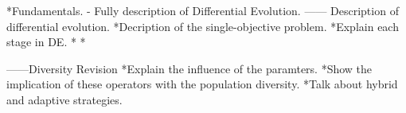 *Fundamentals. - Fully description of Differential Evolution.
------ Description of differential evolution.
*Decription of the single-objective problem.
*Explain each stage in DE.
*
*

------Diversity Revision
*Explain the influence of the paramters.
*Show the implication of these operators with the population diversity.
*Talk about hybrid and adaptive strategies.

